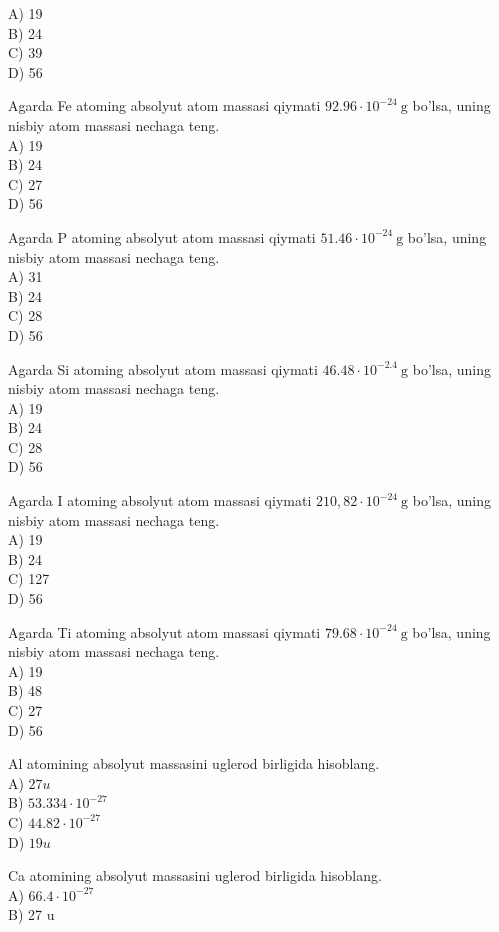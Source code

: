 A) 19\\
B) 24\\
C) 39\\
D) 56
  \item Agarda Fe atoming absolyut atom massasi qiymati $92.96 \cdot 10^{-24} \mathrm{~g}$ bo'lsa, uning nisbiy atom massasi nechaga teng.\\
A) 19\\
B) 24\\
C) 27\\
D) 56
  \item Agarda P atoming absolyut atom massasi qiymati $51.46 \cdot 10^{-24} \mathrm{~g}$ bo'lsa, uning nisbiy atom massasi nechaga teng.\\
A) 31\\
B) 24\\
C) 28\\
D) 56
  \item Agarda Si atoming absolyut atom massasi qiymati $46.48 \cdot 10^{-2.4} \mathrm{~g}$ bo'lsa, uning nisbiy atom massasi nechaga teng.\\
A) 19\\
B) 24\\
C) 28\\
D) 56
  \item Agarda I atoming absolyut atom massasi qiymati $210,82 \cdot 10^{-24} \mathrm{~g}$ bo'lsa, uning nisbiy atom massasi nechaga teng.\\
A) 19\\
B) 24\\
C) 127\\
D) 56
  \item Agarda Ti atoming absolyut atom massasi qiymati $79.68 \cdot 10^{-24} \mathrm{~g}$ bo'lsa, uning nisbiy atom massasi nechaga teng.\\
A) 19\\
B) 48\\
C) 27\\
D) 56
  \item Al atomining absolyut massasini uglerod birligida hisoblang.\\
A) $27 u$\\
B) $53.334 \cdot 10^{-27}$\\
C) $44.82 \cdot 10^{-27}$\\
D) $19 u$
  \item Ca atomining absolyut massasini uglerod birligida hisoblang.\\
A) $66.4 \cdot 10^{-27}$\\
B) 27 u\\
